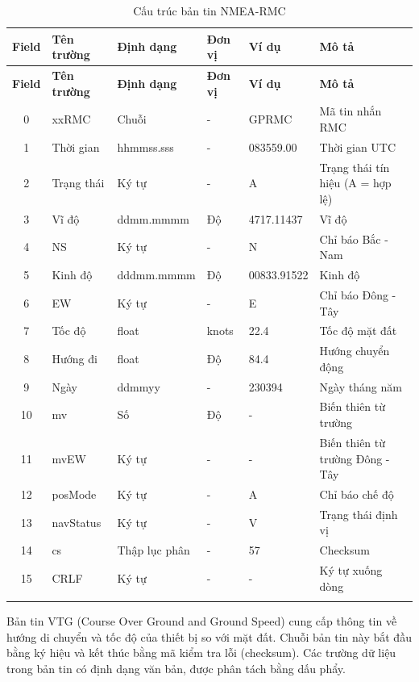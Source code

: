 \documentclass[../DoAn.tex]{subfiles}
\begin{document}
\begin{longtable}{|c|l|l|l|l|p{4cm}|}
\hline
\textbf{Field} & \textbf{Tên trường} & \textbf{Định dạng} & \textbf{Đơn vị} & \textbf{Ví dụ} & \textbf{Mô tả} \\
\hline
\endfirsthead

\hline
\textbf{Field} & \textbf{Tên trường} & \textbf{Định dạng} & \textbf{Đơn vị} & \textbf{Ví dụ} & \textbf{Mô tả} \\
\hline
\endhead

\hline
\endfoot

\endlastfoot

0 & xxRMC & Chuỗi & - & GPRMC & Mã tin nhắn RMC \\ \hline
1 & Thời gian & hhmmss.sss & - & 083559.00 & Thời gian UTC \\ \hline
2 & Trạng thái & Ký tự & - & A & Trạng thái tín hiệu (A = hợp lệ) \\ \hline
3 & Vĩ độ & ddmm.mmmm & Độ & 4717.11437 & Vĩ độ \\ \hline
4 & NS & Ký tự & - & N & Chỉ báo Bắc - Nam \\ \hline
5 & Kinh độ & dddmm.mmmm & Độ & 00833.91522 & Kinh độ \\ \hline
6 & EW & Ký tự & - & E & Chỉ báo Đông - Tây \\ \hline
7 & Tốc độ & float & knots & 22.4 & Tốc độ mặt đất \\ \hline
8 & Hướng đi & float & Độ & 84.4 & Hướng chuyển động \\ \hline
9 & Ngày & ddmmyy & - & 230394 & Ngày tháng năm \\ \hline
10 & mv & Số & Độ & - & Biến thiên từ trường \\ \hline
11 & mvEW & Ký tự & - & - & Biến thiên từ trường Đông - Tây \\ \hline
12 & posMode & Ký tự & - & A & Chỉ báo chế độ \\ \hline
13 & navStatus & Ký tự & - & V & Trạng thái định vị \\ \hline
14 & cs & Thập lục phân & - & 57 & Checksum \\ \hline
15 & CRLF & Ký tự & - & - & Ký tự xuống dòng \\ \hline

\caption{Cấu trúc bản tin NMEA-RMC} \\
\end{longtable}

Bản tin VTG (Course Over Ground and Ground Speed) cung cấp thông tin về hướng di chuyển và tốc độ của thiết bị so với mặt đất. Chuỗi bản tin này bắt đầu bằng ký hiệu  và kết thúc bằng mã kiểm tra lỗi (checksum). Các trường dữ liệu trong bản tin có định dạng văn bản, được phân tách bằng dấu phẩy.
\end{document}
